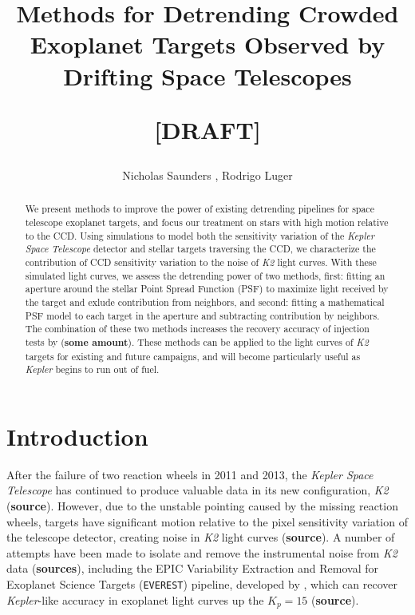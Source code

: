 \documentclass[12pt,preprint]{aastex}
\begin{document}
\title{
	Methods for Detrending Crowded Exoplanet Targets Observed by Drifting Space Telescopes
	\begin{center}
		[DRAFT]
	\end{center}
}

\author{Nicholas Saunders , Rodrigo Luger }



\begin{abstract}

We present methods to improve the power of existing detrending pipelines for space telescope exoplanet targets, and focus our treatment on stars with high motion relative to the CCD. Using simulations to model both the sensitivity variation of the \textit{Kepler Space Telescope} detector and stellar targets traversing the CCD, we characterize the contribution of CCD sensitivity variation to the noise of \textit{K2} light curves. With these simulated light curves, we assess the detrending power of two methods, first: fitting an aperture around the stellar Point Spread Function (PSF) to maximize light received by the target and exlude contribution from neighbors, and second: fitting a mathematical PSF model to each target in the aperture and subtracting contribution by neighbors. The combination of these two methods increases the recovery accuracy of injection tests by (\textbf{some amount}). These methods can be applied to the light curves of \textit{K2} targets for existing and future campaigns, and will become particularly useful as \textit{Kepler} begins to run out of fuel.

\end{abstract}

\section{Introduction}

After the failure of two reaction wheels in 2011 and 2013, the \textit{Kepler Space Telescope} has continued to produce valuable data in its new configuration, \textit{K2} (\textbf{source}). However, due to the unstable pointing caused by the missing reaction wheels, targets have significant motion relative to the pixel sensitivity variation of the telescope detector, creating noise in \textit{K2} light curves (\textbf{source}). A number of attempts have been made to isolate and remove the instrumental noise from \textit{K2} data (\textbf{sources}), including the EPIC Variability Extraction and Removal for Exoplanet Science Targets (\texttt{EVEREST}) pipeline, developed by \cite{2017arXiv170205488L}, which can recover \textit{Kepler}-like accuracy in exoplanet light curves up the $K_p = 15$ (\textbf{source}).
\end{document}

